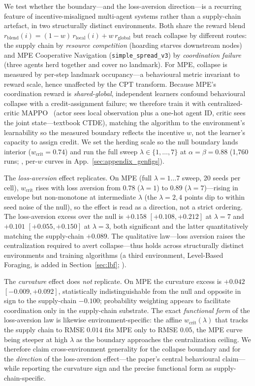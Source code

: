 \documentclass[letterpaper]{article}
\theoremstyle{plain}
\newcommand{\wcrit}{w_{\mathrm{crit}}}
\begin{document}
We test whether the boundary---and the loss-aversion direction---is a recurring
feature of incentive-misaligned multi-agent systems rather than a supply-chain
artefact, in two structurally distinct environments. Both share the reward blend
$r_{\text{blend}}(i)=(1-w)\,r_{\text{local}}(i)+w\,r_{\text{global}}$ but reach
collapse by different routes: the supply chain by \emph{resource competition}
(hoarding starves downstream nodes) and MPE Cooperative Navigation
(\texttt{simple\_spread\_v3}) by \emph{coordination failure} (three agents herd
together and cover no landmark). For MPE, collapse is measured by per-step
landmark occupancy---a behavioural metric invariant to reward scale, hence
unaffected by the CPT transform. Because MPE's coordination reward is
\emph{shared-global}, independent learners confound behavioural collapse with a
credit-assignment failure; we therefore train it with centralized-critic
MAPPO~\citep{yu2022surprising} (actor sees local observation plus a one-hot agent
ID, critic sees the joint state---textbook CTDE), matching the algorithm to the
environment's learnability so the measured boundary reflects the incentive $w$,
not the learner's capacity to assign credit. We set the herding scale so the null
boundary lands interior ($\wcrit{=}0.74$) and run the full sweep
$\lambda\in\{1,\ldots,7\}$ at $\alpha{=}\beta{=}0.88$ (1{,}760 runs;
, per-$w$ curves in App.~\ref{sec:appendix_genfigs}).

The \emph{loss-aversion} effect replicates. On MPE (full $\lambda{=}1{\ldots}7$
sweep, 20 seeds per cell), $\wcrit$ rises with loss aversion from $0.78$
($\lambda{=}1$) to $0.89$ ($\lambda{=}7$)---rising in envelope but non-monotone at
intermediate $\lambda$ (the $\lambda{=}2,4$ points dip to within seed noise of the
null), so the effect is read as a direction, not a strict ordering. The
loss-aversion excess over the null is $+0.158$ $[+0.108, +0.212]$ at
$\lambda{=}7$ and $+0.101$ $[+0.055, +0.150]$ at $\lambda{=}3$, both significant
and the latter quantitatively matching the supply-chain $+0.089$. The
qualitative law---loss aversion raises the centralization required to avert
collapse---thus holds across structurally distinct environments and training
algorithms (a third environment, Level-Based Foraging, is added in
Section~\ref{sec:lbf}; ).

The \emph{curvature} effect does \emph{not} replicate. On MPE the curvature
excess is $+0.042$ $[-0.009, +0.092]$, statistically indistinguishable from the
null and opposite in sign to the supply-chain $-0.100$; probability weighting
appears to facilitate coordination only in the supply-chain substrate. The exact
\emph{functional form} of the loss-aversion law is likewise environment-specific:
the affine $\wcrit(\lambda)$ that tracks the supply chain to RMSE $0.014$ fits MPE
only to RMSE $0.05$, the MPE curve being steeper at high $\lambda$ as the boundary
approaches the centralization ceiling. We therefore claim cross-environment
generality for the collapse boundary and for the \emph{direction} of the
loss-aversion effect---the paper's central behavioural claim---while reporting the
curvature sign and the precise functional form as supply-chain-specific.
\end{document}
